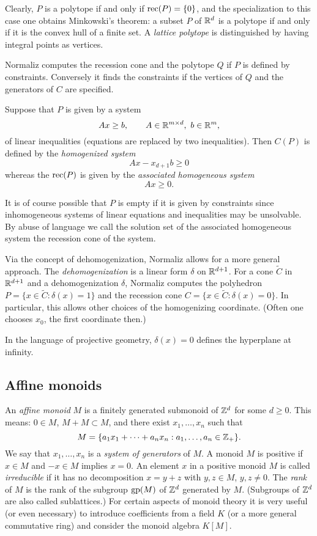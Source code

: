 Clearly, $P$ is a polytope if and only if $\operatorname{rec}(P)=\{0\}$, and the specialization to this case one obtains Minkowski's theorem: a subset $P$ of ${\mathbb R}^d$ is a polytope if and only if it is the convex hull of a finite set. A \emph{lattice polytope} is distinguished by having integral points as vertices.

Normaliz computes the recession cone and the polytope $Q$ if $P$ is defined by constraints. Conversely it finds the constraints if the vertices of $Q$ and the generators of $C$ are specified.

Suppose that $P$ is given by a system
$$
Ax\ge b, \qquad A\in{\mathbb R}^{m\times d},\ b\in {\mathbb R}^m,
$$
of linear inequalities (equations are replaced by two inequalities). Then $C(P)$ is defined by the \emph{homogenized system}
$$
Ax-x_{d+1}b\ge 0
$$
whereas the $\operatorname{rec}(P)$ is given by the \emph{associated homogeneous system}
$$
Ax\ge 0.
$$

It is of course possible that $P$ is empty if it is given by constraints since inhomogeneous systems of linear equations and inequalities may be unsolvable. By abuse of language we call the solution set of the associated homogeneous system the recession cone of the system.

Via the concept of dehomogenization, Normaliz allows for a more general approach. The \emph{dehomogenization} is a linear form $\delta$ on ${\mathbb R}^{d+1}$. For a cone $\widetilde C$ in ${\mathbb R}^{d+1}$ and a dehomogenization $\delta$, Normaliz computes the polyhedron $P=\{x\in \widetilde C: \delta(x)=1\}$ and the recession cone $C=\{x\in \widetilde C: \delta(x)=0\}$. In particular, this allows other choices of the homogenizing coordinate. (Often one chooses $x_0$, the first coordinate then.)

In the language of projective geometry, $\delta(x)=0$ defines the hyperplane at infinity.

\subsection{Affine monoids}\label{affine_monids}

An \emph{affine monoid} $M$ is a finitely generated submonoid of ${\mathbb Z}^d$ for some $d\ge0$. This means: $0\in M$, $M+M\subset M$, and there exist $x_1,\dots,x_n$ such that
$$
M=\{a_1x_1+\dots+a_nx_n: a_1,\dots,a_n\in{\mathbb Z}_+\}.
$$
We say that $x_1,\dots,x_n$ is a \emph{system of generators} of $M$. A monoid $M$ is positive if $x\in M$ and $-x\in M$ implies $x=0$. An element $x$ in a positive monoid $M$ is called \emph{irreducible} if it has no decomposition $x=y+z$ with $y,z\in M$, $y,z\neq0$. The \emph{rank} of $M$ is the rank of the subgroup $\operatorname{gp}(M)$ of ${\mathbb Z}^d$ generated by $M$. (Subgroups of ${\mathbb Z}^d$ are also called sublattices.)
For certain aspects of monoid theory it is very useful (or even necessary) to introduce coefficients from a field $K$ (or a more general commutative ring) and consider the monoid algebra $K[M]$.


